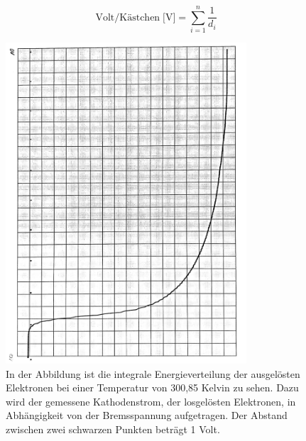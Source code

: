 \documentclass[titlepage = firstcover]{scrartcl}
\begin{document}
            \begin{equation*}
                \text{Volt/Kästchen} \; \text{[V]} = \sum_{i=1}^{n} \frac{1}{d_i}
            \end{equation*}

            \FloatBarrier

                \begin{figure}[h]
                  \centering
                  \includegraphics[width = 0.8\textwidth, angle=90]{T300.pdf}
                  \caption{In der Abbildung ist die integrale Energieverteilung der ausgelösten Elektronen bei einer Temperatur von 300,85 Kelvin zu sehen. Dazu wird der gemessene Kathodenstrom, der losgelösten Elektronen, in Abhängigkeit von der Bremsspannung aufgetragen. Der Abstand zwischen zwei schwarzen Punkten beträgt 1 Volt.}
                  \label{fig:Bild300}
                \end{figure}
\end{document}
